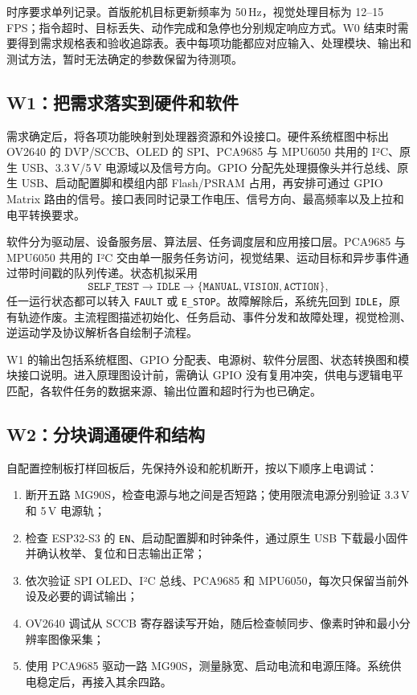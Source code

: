 时序要求单列记录。首版舵机目标更新频率为 50\,Hz，视觉处理目标为 12--15\,FPS；指令超时、目标丢失、动作完成和急停也分别规定响应方式。W0 结束时需要得到需求规格表和验收追踪表。表中每项功能都应对应输入、处理模块、输出和测试方法，暂时无法确定的参数保留为待测项。

\subsection{W1：把需求落实到硬件和软件}

需求确定后，将各项功能映射到处理器资源和外设接口。硬件系统框图中标出 OV2640 的 DVP/SCCB、OLED 的 SPI、PCA9685 与 MPU6050 共用的 I²C、原生 USB、3.3\,V/5\,V 电源域以及信号方向。GPIO 分配先处理摄像头并行总线、原生 USB、启动配置脚和模组内部 Flash/PSRAM 占用，再安排可通过 GPIO Matrix 路由的信号。接口表同时记录工作电压、信号方向、最高频率以及上拉和电平转换要求。

软件分为驱动层、设备服务层、算法层、任务调度层和应用接口层。PCA9685 与 MPU6050 共用的 I²C 交由单一服务任务访问，视觉结果、运动目标和异步事件通过带时间戳的队列传递。状态机拟采用
\[
  \texttt{SELF\_TEST}\rightarrow\texttt{IDLE}
  \rightarrow\{\texttt{MANUAL},\texttt{VISION},\texttt{ACTION}\},
\]
任一运行状态都可以转入 \texttt{FAULT} 或 \texttt{E\_STOP}。故障解除后，系统先回到 \texttt{IDLE}，原有轨迹作废。主流程图描述初始化、任务启动、事件分发和故障处理，视觉检测、逆运动学及协议解析各自绘制子流程。

W1 的输出包括系统框图、GPIO 分配表、电源树、软件分层图、状态转换图和模块接口说明。进入原理图设计前，需确认 GPIO 没有复用冲突，供电与逻辑电平匹配，各软件任务的数据来源、输出位置和超时行为也已确定。

\subsection{W2：分块调通硬件和结构}

自配置控制板打样回板后，先保持外设和舵机断开，按以下顺序上电调试：

\begin{enumerate}
  \item 断开五路 MG90S，检查电源与地之间是否短路；使用限流电源分别验证 3.3\,V 和 5\,V 电源轨；
  \item 检查 ESP32-S3 的 \texttt{EN}、启动配置脚和时钟条件，通过原生 USB 下载最小固件并确认枚举、复位和日志输出正常；
  \item 依次验证 SPI OLED、I²C 总线、PCA9685 和 MPU6050，每次只保留当前外设及必要的调试输出；
  \item OV2640 调试从 SCCB 寄存器读写开始，随后检查帧同步、像素时钟和最小分辨率图像采集；
  \item 使用 PCA9685 驱动一路 MG90S，测量脉宽、启动电流和电源压降。系统供电稳定后，再接入其余四路。
\end{enumerate}


